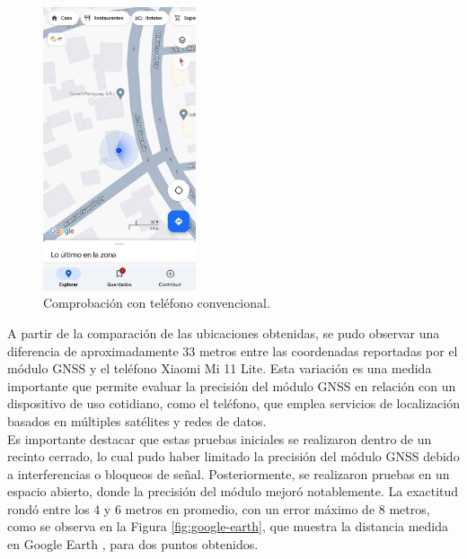 \begin{figure}[H]
\leavevmode
\begin{minipage}{\textwidth}
\begin{center}
\includegraphics[width=0.4\textwidth]{./capitulo_05/imagen/telefono.jpg}
\caption{Comprobación con teléfono convencional.\label{fig:telefono}}
\end{center}
\end{minipage}
\end{figure}

A partir de la comparación de las ubicaciones obtenidas, se pudo observar una diferencia de aproximadamente 33 metros entre las coordenadas reportadas por el módulo GNSS y el teléfono Xiaomi Mi 11 Lite. Esta variación es una medida importante que permite evaluar la precisión del módulo GNSS en relación con un dispositivo de uso cotidiano, como el teléfono, que emplea servicios de localización basados en múltiples satélites y redes de datos.\\


Es importante destacar que estas pruebas iniciales se realizaron dentro de un recinto cerrado, lo cual pudo haber limitado la precisión del módulo GNSS debido a interferencias o bloqueos de señal. Posteriormente, se realizaron pruebas en un espacio abierto, donde la precisión del módulo mejoró notablemente. La exactitud rondó entre los 4 y 6 metros en promedio, con un error máximo de 8 metros, como se observa en la Figura \ref{fig:google-earth}, que muestra la distancia medida en Google Earth \cite{googleearth2024}, para dos puntos obtenidos.

